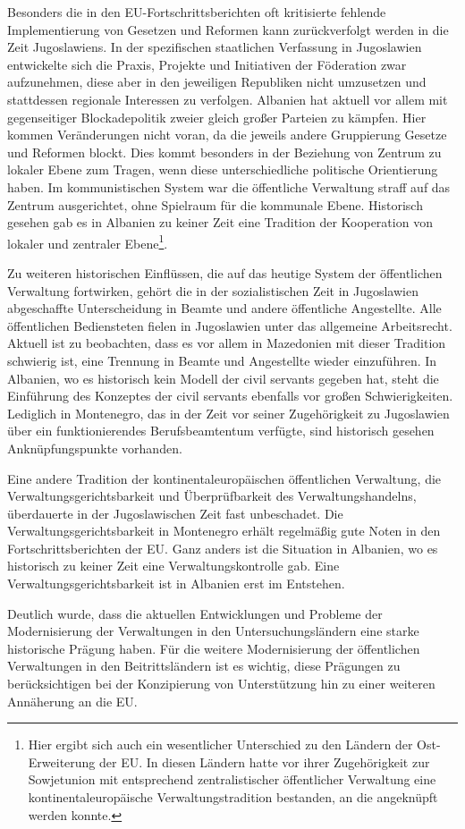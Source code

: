 Besonders die in den EU-Fortschrittsberichten oft kritisierte fehlende Implementierung von Gesetzen und Reformen kann zurückverfolgt werden in die Zeit Jugoslawiens. In der spezifischen staatlichen Verfassung in Jugoslawien entwickelte sich die Praxis, Projekte und Initiativen der Föderation zwar aufzunehmen, diese aber in den jeweiligen Republiken nicht umzusetzen und stattdessen regionale Interessen zu verfolgen. Albanien hat aktuell vor allem mit gegenseitiger Blockadepolitik zweier gleich großer Parteien zu kämpfen. Hier kommen Veränderungen nicht voran, da die jeweils andere Gruppierung Gesetze und Reformen blockt. Dies kommt besonders in der Beziehung von Zentrum zu lokaler Ebene zum Tragen, wenn diese unterschiedliche politische Orientierung haben. Im kommunistischen System war die öffentliche Verwaltung straff auf das Zentrum ausgerichtet, ohne Spielraum für die kommunale Ebene. Historisch gesehen gab es in Albanien zu keiner Zeit eine Tradition der Kooperation von lokaler und zentraler Ebene\footnote{Hier ergibt sich auch ein wesentlicher Unterschied zu den Ländern der Ost-Erweiterung der EU. In diesen Ländern hatte vor ihrer Zugehörigkeit zur Sowjetunion mit entsprechend zentralistischer öffentlicher Verwaltung eine kontinentaleuropäische Verwaltungstradition bestanden, an die angeknüpft werden konnte.
}.\par
Zu weiteren historischen Einflüssen, die auf das heutige System der öffentlichen Verwaltung fortwirken, gehört die in der sozialistischen Zeit in Jugoslawien abgeschaffte Unterscheidung in Beamte und andere öffentliche Angestellte. Alle öffentlichen Bediensteten fielen in Jugoslawien unter das allgemeine Arbeitsrecht. Aktuell ist zu beobachten, dass es vor allem in Mazedonien mit dieser Tradition schwierig ist, eine Trennung in Beamte und Angestellte wieder einzuführen. In Albanien, wo es historisch kein Modell der civil servants gegeben hat, steht die Einführung des Konzeptes der civil servants ebenfalls vor großen Schwierigkeiten. Lediglich in Montenegro, das in der Zeit vor seiner Zugehörigkeit zu Jugoslawien über ein funktionierendes Berufsbeamtentum verfügte, sind historisch gesehen Anknüpfungspunkte vorhanden. \par
Eine andere Tradition der kontinentaleuropäischen öffentlichen Verwaltung, die Verwaltungsgerichtsbarkeit und Überprüfbarkeit des Verwaltungshandelns, überdauerte in der Jugoslawischen Zeit fast unbeschadet. Die Verwaltungsgerichtsbarkeit in Montenegro erhält regelmäßig gute Noten in den Fortschrittsberichten der EU. Ganz anders ist die Situation in Albanien, wo es historisch zu keiner Zeit eine Verwaltungskontrolle gab. Eine Verwaltungsgerichtsbarkeit ist in Albanien erst im Entstehen. \par
Deutlich wurde, dass die aktuellen Entwicklungen und Probleme der Modernisierung der Verwaltungen in den Untersuchungsländern eine starke historische Prägung haben. Für die weitere Modernisierung der öffentlichen Verwaltungen in den Beitrittsländern ist es wichtig, diese Prägungen zu berücksichtigen bei der Konzipierung von Unterstützung hin zu einer weiteren Annäherung an die EU.

